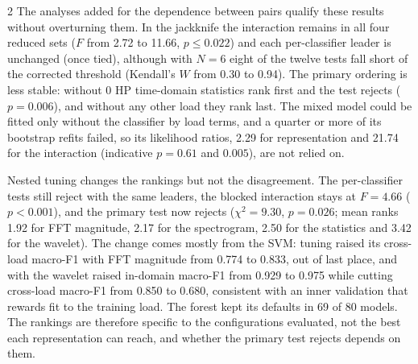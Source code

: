 \documentclass[12pt,twoside,titlepage]{ingenius}
\begin{document}
\begin{multicols}{2}
The analyses added for the dependence between pairs qualify these results
without overturning them. In the jackknife the interaction remains in all four
reduced sets ($F$ from 2.72 to 11.66, $p \le 0.022$) and each per-classifier
leader is unchanged (once tied), although with $N = 6$ eight of the twelve tests
fall short of the corrected threshold (Kendall's $W$ from 0.30 to 0.94). The
primary ordering is less stable: without 0 HP time-domain statistics rank first
and the test rejects ($p = 0.006$), and without any other load they rank last.
The mixed model could be fitted only without the classifier by load terms, and
a quarter or more of its bootstrap refits failed, so its likelihood ratios, 2.29
for representation and 21.74 for the interaction (indicative $p = 0.61$ and
$0.005$), are not relied on.

Nested tuning changes the rankings but not the disagreement. The per-classifier
tests still reject with the same leaders, the blocked interaction stays at
$F = 4.66$ ($p < 0.001$), and the primary test now rejects ($\chi^2 = 9.30$,
$p = 0.026$; mean ranks 1.92 for FFT magnitude, 2.17 for the spectrogram, 2.50
for the statistics and 3.42 for the wavelet). The change comes mostly from the
SVM: tuning raised its cross-load macro-F1 with FFT magnitude from 0.774 to
0.833, out of last place, and with the wavelet raised in-domain macro-F1 from
0.929 to 0.975 while cutting cross-load macro-F1 from 0.850 to 0.680, consistent with an inner validation that rewards fit to the training load. The forest kept its defaults
in 69 of 80 models. The rankings are therefore specific to the configurations
evaluated, not the best each representation can reach, and whether the primary test rejects depends on them.

\begin{table}[H]
\centering
{}
\label{tab:anova}
\end{table}


\end{multicols}
\end{document}
